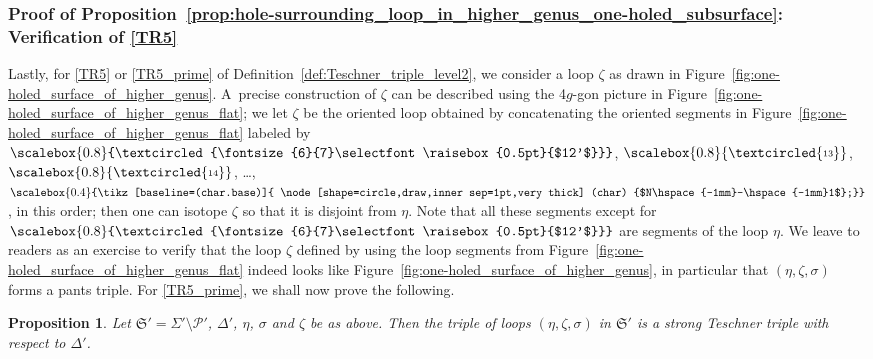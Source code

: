 \documentclass[10pt,a4paper]{amsart}
\numberwithin{equation}{section}
\newtheorem{Proposition}[Theorem]{Proposition}
\theoremstyle{definition}
\newcommand{\circledd}[1]{\scalebox{0.8}{\textcircled{\fontsize{6}{7}\selectfont \raisebox{0.5pt}{#1}}}}
\newcommand*\circleddd[1]{\scalebox{0.4}{\tikz[baseline=(char.base)]{
 \node[shape=circle,draw,inner sep=1pt,very thick] (char) {#1};}}}
\begin{document}
\subsubsection{Proof of Proposition~\ref{prop:hole-surrounding_loop_in_higher_genus_one-holed_subsurface}: Verification of \ref{TR5}}
\label{subsec:hole-surrounding_loop_in_one-holed_subsurface_deeper}
Lastly, for \ref{TR5} or \ref{TR5_prime} of Definition~\ref{def:Teschner_triple_level2}, we consider a loop $\zeta$ as drawn in Figure~\ref{fig:one-holed_surface_of_higher_genus}. A~precise construction of $\zeta$ can be described using the 4$g$-gon picture in Figure~\ref{fig:one-holed_surface_of_higher_genus_flat}; we let $\zeta$ be the oriented loop obtained by concatenating the oriented segments in Figure~\ref{fig:one-holed_surface_of_higher_genus_flat} labeled by $\circledd{$12'$}$, $\circledd{13}$, $\circledd{14}$, \dots, $\circleddd{$N\hspace{-1mm}-\hspace{-1mm}1$}$, in this order; then one can isotope $\zeta$ so that it is disjoint from $\eta$. Note that all these segments except for $\circledd{$12'$}$ are segments of the loop $\eta$. We leave to readers as an exercise to verify that the loop $\zeta$ defined by using the loop segments from Figure~\ref{fig:one-holed_surface_of_higher_genus_flat} indeed looks like Figure~\ref{fig:one-holed_surface_of_higher_genus}, in particular that $(\eta,\zeta,\sigma)$ forms a pants triple. For \ref{TR5_prime}, we shall now prove the following.
\begin{Proposition}
\label{prop:ohs_going_one_level_deeper}
Let $\mathfrak{S}' = \Sigma' \setminus \mathcal{P}'$, $\Delta'$, $\eta$, $\sigma$ and $\zeta$ be as above. Then the triple of loops $(\eta,\zeta,\sigma)$ in $\mathfrak{S}'$ is a strong Teschner triple with respect to $\Delta'$.
\end{Proposition}
\end{document}

